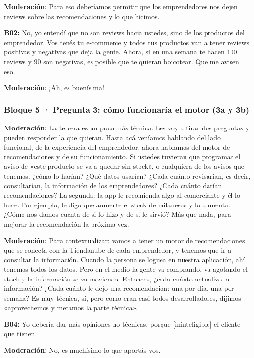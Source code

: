 \noindent\textbf{Moderación:} Para eso deberíamos permitir que los emprendedores nos dejen reviews sobre las recomendaciones y lo que hicimos.

\noindent\textbf{B02:} No, yo entendí que no son reviews hacia ustedes, sino de los productos del emprendedor. Vos tenés tu e-commerce y todos tus productos van a tener reviews positivas y negativas que deja la gente. Ahora, si en una semana te hacen 100 reviews y 90 son negativas, es posible que te quieran boicotear. Que me avisen eso.

\noindent\textbf{Moderación:} ¡Ah, es buenísima!

\subsubsection*{Bloque 5 · Pregunta 3: cómo funcionaría el motor (3a y 3b)}

\noindent\textbf{Moderación:} La tercera es un poco más técnica. Les voy a tirar dos preguntas y pueden responder la que quieran. Hasta acá veníamos hablando del lado funcional, de la experiencia del emprendedor; ahora hablamos del motor de recomendaciones y de su funcionamiento. Si ustedes tuvieran que programar el aviso de «este producto se va a quedar sin stock», o cualquiera de los avisos que tenemos, ¿cómo lo harían? ¿Qué datos usarían? ¿Cada cuánto revisarían, es decir, consultarían, la información de los emprendedores? ¿Cada cuánto darían recomendaciones? La segunda: la app le recomienda algo al comerciante y él lo hace. Por ejemplo, le digo que aumente el stock de milanesas y lo aumenta. ¿Cómo nos damos cuenta de si lo hizo y de si le sirvió? Más que nada, para mejorar la recomendación la próxima vez.

\noindent\textbf{Moderación:} Para contextualizar: vamos a tener un motor de recomendaciones que se conecta con la Tiendanube de cada emprendedor, y tenemos que ir a consultar la información. Cuando la persona se loguea en nuestra aplicación, ahí tenemos todos los datos. Pero en el medio la gente va comprando, va agotando el stock y la información se va moviendo. Entonces, ¿cada cuánto actualizo la información? ¿Cada cuánto le dejo una recomendación: una por día, una por semana? Es muy técnica, sí, pero como eran casi todos desarrolladores, dijimos «aprovechemos y metamos la parte técnica».

\noindent\textbf{B04:} Yo debería dar más opiniones no técnicas, porque [ininteligible] el cliente que tienen.

\noindent\textbf{Moderación:} No, es muchísimo lo que aportás vos.

